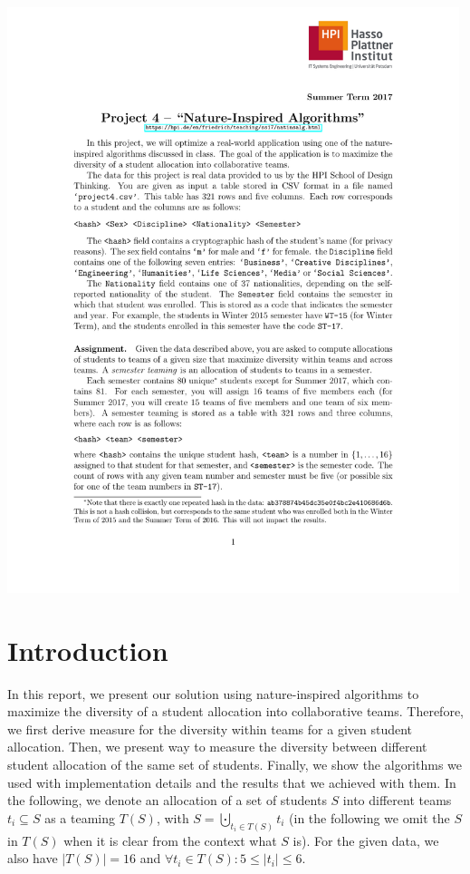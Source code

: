 \documentclass[12pt,a4paper]{article}
\begin{document}
\includegraphics[clip, trim=0.5cm 16.5cm 0.5cm 4cm, width=0.99\textwidth, page=3]{project4.pdf}

\section{Introduction}
\label{sec:introduction}
In this report, we present our solution using nature-inspired algorithms to maximize the diversity of a student allocation into collaborative teams. Therefore, we first derive measure for the diversity within teams for a given student allocation. Then, we present way to measure the diversity between different student allocation of the same set of students. Finally, we show the algorithms we used with implementation details and the results that we achieved with them. In the following, we denote an allocation of a set of students $S$ into different teams $t_i \subseteq S$ as a teaming $T(S)$, with $S = \bigcupdot_{t_i \in T(S)} t_i$ (in the following we omit the $S$ in $T(S)$ when it is clear from the context what $S$ is). For the given data, we also have $|T(S)| = 16$ and $\forall t_i \in T(S): 5 \leq |t_i| \leq 6$.
\end{document}
